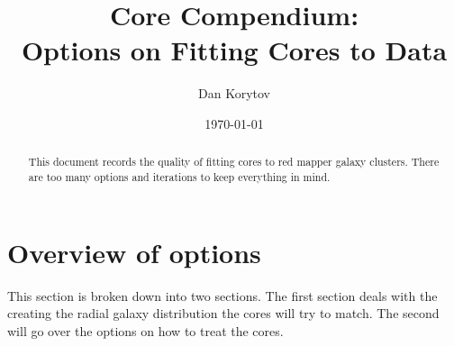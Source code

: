 \documentclass[twocolumn]{article}
\author{Dan Korytov}
\title {\textbf{Core Compendium}:\\[.2em]Options on Fitting Cores to Data}
\date{\today}
\begin{document}
\maketitle

\begin{abstract}
This document records the quality of fitting cores to red mapper
galaxy clusters. There are too many options and iterations to keep
everything in mind.
\end{abstract}


\section{Overview of options}
This section is broken down into two sections. The first section deals
with the creating the radial galaxy distribution the cores will try
to match. The second will go over the options on how to treat the
cores. 
\end{document}

